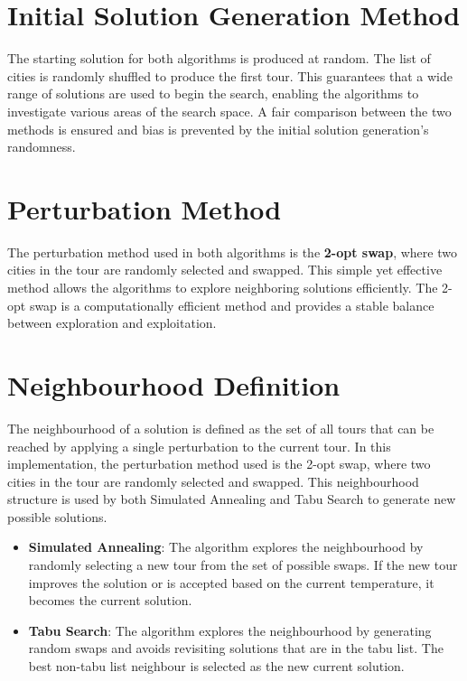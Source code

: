 \documentclass{article}
\begin{document}
\section{Initial Solution Generation Method}
The starting solution for both algorithms is produced at random. The list of cities is randomly shuffled to produce the first tour. This guarantees that a wide range of solutions are used to begin the search, enabling the algorithms to investigate various areas of the search space. A fair comparison between the two methods is ensured and bias is prevented by the initial solution generation's randomness.

\section{Perturbation Method}
The perturbation method used in both algorithms is the \textbf{2-opt swap}, where two cities in the tour are randomly selected and swapped. This simple yet effective method allows the algorithms to explore neighboring solutions efficiently. The 2-opt swap is a computationally efficient method and provides a stable balance between exploration and exploitation.

\section{Neighbourhood Definition}
The neighbourhood of a solution is defined as the set of all tours that can be reached by applying a single perturbation to the current tour. In this implementation, the perturbation method used is the 2-opt swap, where two cities in the tour are randomly selected and swapped. This neighbourhood structure is used by both Simulated Annealing and Tabu Search to generate new possible solutions.

\begin{itemize}
    \item \textbf{Simulated Annealing}: The algorithm explores the neighbourhood by randomly selecting a new tour from the set of possible swaps. If the new tour improves the solution or is accepted based on the current temperature, it becomes the current solution.
    \item \textbf{Tabu Search}: The algorithm explores the neighbourhood by generating random swaps and avoids revisiting solutions that are in the tabu list. The best non-tabu list neighbour is selected as the new current solution.
\end{itemize}
\end{document}
